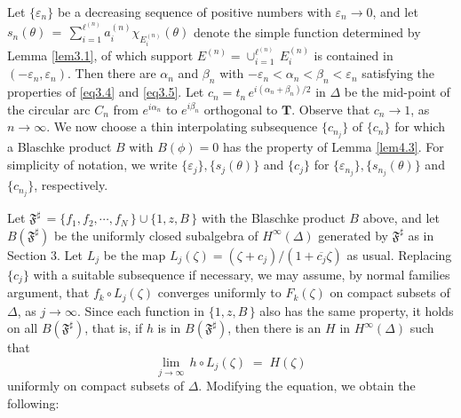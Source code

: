 \documentclass[12pt]{amsart}
\theoremstyle{plain}
\numberwithin{equation}{section}
\begin{document}
Let $\{\varepsilon_n\}$ be a decreasing sequence of positive numbers with
$\varepsilon_n \to 0$, and let $s_n(\theta)\,=\,\sum_{i=1}^{\ell^{(n)}}
a_i^{(n)} \chi_{E_i^{(n)}}(\theta)$
denote the simple function determined by Lemma \ref{lem3.1},
of which support $E^{(n)} = \cup_{i=1}^{\ell^{(n)}}\, E_i^{(n)}$
is contained in $(-\varepsilon_n, \varepsilon_n)$.
Then there are
$\alpha_n$ and $\beta_n$ with $-\varepsilon_n < \alpha_n
< \beta_n < \varepsilon_n$ satisfying the properties of
\eqref{eq3.4} and \eqref{eq3.5}.
Let $c_n=t_n\,e^{i(\alpha_n+\beta_n)/2}$ in $\Delta$ be the mid-point
of the circular arc $C_n$ from $e^{i\alpha_n}$ to $e^{i\beta_n}$ orthogonal to
$\mathbf{T}$. Observe that $c_n \to 1$, as $n\to\infty$. We now
choose a thin interpolating subsequence $\{c_{n_j}\}$ of $\{c_n\}$
for which a Blaschke product $B$ with $B(\phi)=0$ has the
property of Lemma \ref{lem4.3}. For simplicity of notation, we write $\{\varepsilon_j\}, \{s_j(\theta)\}$ and $\{c_j\}$ for
$\{\varepsilon_{n_j}\}, \{s_{n_j}(\theta)\}$ and $\{c_{n_j}\}$,
respectively.

Let $\mathfrak{F}^\sharp\,= \{f_1, f_2, \cdots, f_N\,\}\cup \{1, z, B \,\}$
with the Blaschke product $B$ above, and let $B(\mathfrak{F}^\sharp)$
be the uniformly closed subalgebra of $H^\infty(\Delta)$ generated by
$\mathfrak{F}^\sharp$ as in Section 3. Let $L_j$ be the map $L_j(\zeta)=(\zeta+c_j)/(1+\overline{c_j}\zeta)$ as usual.
Replacing $\{c_j\}$ with a suitable subsequence
if necessary, we may assume, by normal families argument, that
$f_k\circ L_j(\zeta)$ converges uniformly
to $F_k(\zeta)$ on compact subsets of $\Delta$, as $j \to \infty$.
Since each function in $\{1, z, B \,\}$ also has the same property,
it holds on all $B(\mathfrak{F}^\sharp)$, that is, if $h$ is in
$B(\mathfrak{F}^\sharp)$, then there is an $H$ in $H^\infty(\Delta)$ such that
\begin{equation}
\label{eq5.1}
\lim_{j\to\infty}\, h\circ L_j(\zeta)\;=\; H(\zeta)
\end{equation}
uniformly on compact subsets of $\Delta$.
Modifying the equation, we obtain the following:
\end{document}

